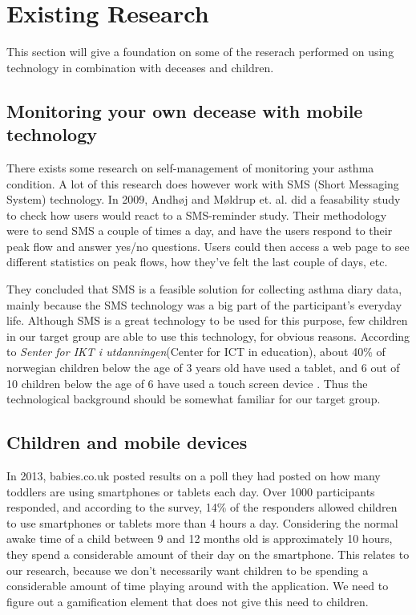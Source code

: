 \section{Existing Research}
\label{sec:existing-research}

This section will give a foundation on some of the reserach performed on using technology in combination with deceases and children. 


\subsection{Monitoring your own decease with mobile technology}
There exists some research on self-management of monitoring your asthma condition. A lot of this research does however work with SMS (Short Messaging System) technology. In 2009, Andh\o j and M\o ldrup et. al.\cite{anhoj2004feasibility} did a feasability study to check how users would react to a SMS-reminder study. Their methodology were to send SMS a couple of times a day, and have the users respond to their peak flow and answer yes/no questions. Users could then access a web page to see different statistics on peak flows, how they've felt the last couple of days, etc.

They concluded that SMS is a feasible solution for collecting asthma diary data, mainly because the SMS technology was a big part of the participant's everyday life. Although SMS is a great technology to be used for this purpose, few children in our target group are able to use this technology, for obvious reasons. According to \emph{Senter for IKT i utdanningen}(Center for ICT in education), about 40\% of norwegian children below the age of 3 years old have used a tablet, and 6 out of 10 children below the age of 6 have used a touch screen device \cite{nrkchilduse}. Thus the technological background should be somewhat familiar for our target group. 

\subsection{Children and mobile devices}
In 2013, babies.co.uk posted results on a poll they had posted on how many toddlers are using smartphones or tablets each day\cite{babiesusageoftablets}. Over 1000 participants responded,  and according to the survey, 14\% of the responders allowed children to use smartphones or tablets more than 4 hours a day. Considering the normal awake time of a child between 9 and 12 months old is approximately 10 hours, they spend a considerable amount of their day on the smartphone. This relates to our research, because we don't necessarily want children to be spending a considerable amount of time playing around with the application. We need to figure out a gamification element that does not give this need to children. 


